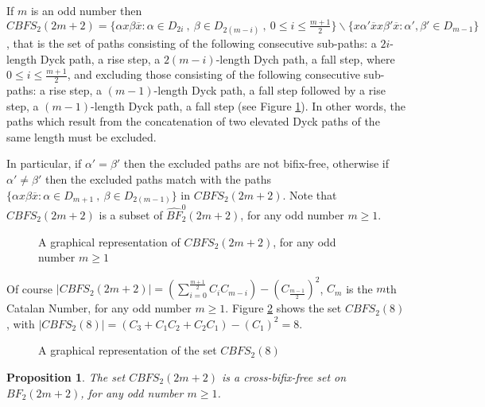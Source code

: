 \documentclass[a4paper,11pt]{article}
\newtheorem{proposition}{Proposition}[section]
\begin{document}
If $m$ is an odd number then $CBFS_2(2m+2) = \{ \alpha x \beta
\overline{x} : \alpha \in D_{2i} \ , \ \beta \in D_{2(m-i)} \ , \
0 \leq i \leq \frac{m+1}{2} \} \backslash \{ x \alpha'
\overline{x} x \beta' \overline{x} : \alpha', \beta' \in D_{m-1}
\}$, that is the set of paths consisting of the following
consecutive sub-paths: a $2i$-length Dyck path, a rise step, a
$2(m-i)$-length Dych path, a fall step, where $0 \leq i \leq
\frac{m+1}{2}$, and excluding those consisting of the following
consecutive sub-paths: a rise step, a $(m-1)$-length Dyck path, a
fall step followed by a rise step, a $(m-1)$-length Dyck path, a
fall step (see Figure \ref{paridispari}). In other words, the
paths which result from the concatenation of two elevated Dyck
paths of the same length must be excluded.

In particular, if $\alpha'=\beta'$ then the excluded paths are not
bifix-free, otherwise if $\alpha' \neq \beta'$ then the excluded
paths match with the paths $\{ \alpha x \beta \overline{x} :
\alpha \in D_{m+1} \ , \ \beta \in D_{2(m-1)} \}$ in
$CBFS_2(2m+2)$. Note that $CBFS_2(2m+2)$ is a subset of
$\hat{BF}^0_2(2m+2)$, for any odd number $m \geq 1$.

\begin{figure}[!htb]
\begin{center}
\caption{\small{A graphical representation of $CBFS_2(2m+2)$, for
any odd number $m \geq 1$} \label{paridispari}}\vspace{-15pt}
\end{center}
\end{figure}

Of course $|CBFS_2(2m+2)|=(\sum_{i=0}^{\frac{m+1}{2}}C_iC_{m-i}) -
(C_{\frac{m-1}{2}})^2$, $C_m$ is the $m$th Catalan Number, for any
odd number $m \geq 1$. Figure \ref{exmparidis} shows the set
$CBFS_2(8)$, with $|CBFS_2(8)|=(C_3+C_1C_2+C_2C_1) - (C_1)^2 = 8$.

\begin{figure}[!htb]
\begin{center}
 \caption{\small{A
graphical representation of the set $CBFS_2(8)$}
\label{exmparidis}}\vspace{-15pt}
\end{center}
\end{figure}

\begin{proposition}\label{paridispariCB}
The set $CBFS_2(2m+2)$ is a cross-bifix-free set on $BF_2(2m+2)$,
for any odd number $m \geq 1$.
\end{proposition}
\end{document}
